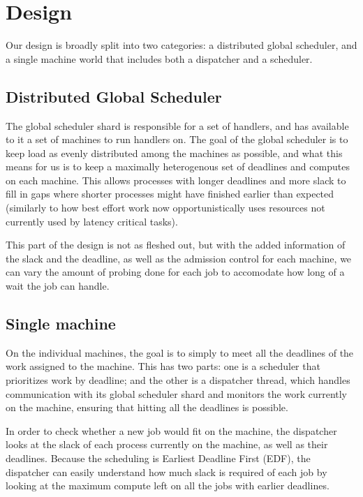\section{Design}

Our design is broadly split into two categories: a distributed global scheduler,
and a single machine world that includes both a dispatcher and a scheduler. 


\subsection*{Distributed Global Scheduler}

The global scheduler shard is responsible for a set of handlers, and has
available to it a set of machines to run handlers on. The goal of the global
scheduler is to keep load as evenly distributed among the machines as possible,
and what this means for us is to keep a maximally heterogenous set of deadlines
and computes on each machine. This allows processes with longer deadlines and
more slack to fill in gaps where shorter processes might have finished earlier
than expected (similarly to how best effort work now opportunistically uses
resources not currently used by latency critical tasks).

This part of the design is not as fleshed out, but with the added information of
the slack and the deadline, as well as the admission control for each machine,
we can vary the amount of probing done for each job to accomodate how long of a
wait the job can handle.


\subsection*{Single machine}


On the individual machines, the goal is to simply to meet all the deadlines of
the work assigned to the machine. This has two parts: one is a scheduler that
prioritizes work by deadline; and the other is a dispatcher thread, which
handles communication with its global scheduler shard and monitors the work
currently on the machine, ensuring that hitting all the deadlines is possible. 

In order to check whether a new job would fit on the machine, the dispatcher
looks at the slack of each process currently on the machine, as well as their
deadlines. Because the scheduling is Earliest Deadline First (EDF), the
dispatcher can easily understand how much slack is required of each job by
looking at the maximum compute left on all the jobs with earlier deadlines. 


